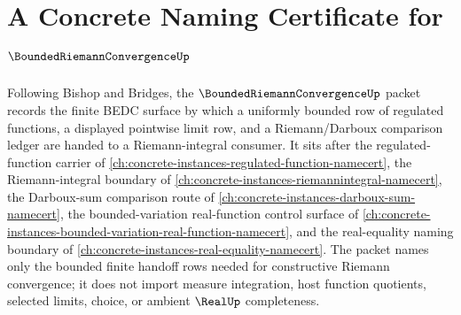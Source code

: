 \chapter{A Concrete Naming Certificate for $\BoundedRiemannConvergenceUp$}
\label{ch:concrete-instances-bounded-riemann-convergence-namecert}

Following Bishop and Bridges, the $\BoundedRiemannConvergenceUp$ packet records the finite BEDC surface by which a uniformly bounded row of regulated functions, a displayed pointwise limit row, and a Riemann/Darboux comparison ledger are handed to a Riemann-integral consumer. It sits after the regulated-function carrier of \autoref{ch:concrete-instances-regulated-function-namecert}, the Riemann-integral boundary of \autoref{ch:concrete-instances-riemannintegral-namecert}, the Darboux-sum comparison route of \autoref{ch:concrete-instances-darboux-sum-namecert}, the bounded-variation real-function control surface of \autoref{ch:concrete-instances-bounded-variation-real-function-namecert}, and the real-equality naming boundary of \autoref{ch:concrete-instances-real-equality-namecert}. The packet names only the bounded finite handoff rows needed for constructive Riemann convergence; it does not import measure integration, host function quotients, selected limits, choice, or ambient $\RealUp$ completeness.

